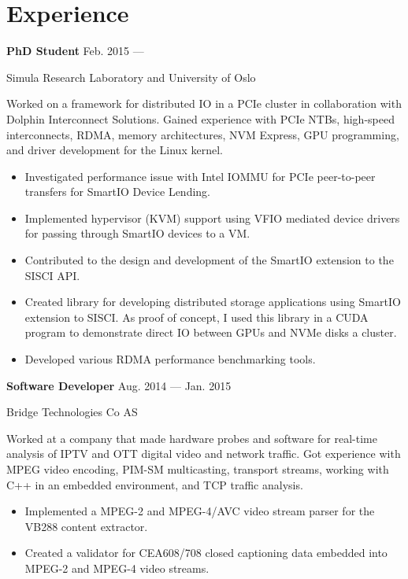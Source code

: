 \section{Experience}
\parbox[t][][t]{\linewidth}{
	\parbox{\linewidth}{\textbf{PhD Student}
		\hfill {{Feb. 2015 --- \phantom{Sep. 2018}}}}
		\smallbreak
	\parbox{\linewidth}{Simula Research Laboratory and University of Oslo}

	\bigskip
	Worked on a framework for distributed IO in a PCIe cluster in
	collaboration with Dolphin Interconnect Solutions. Gained
	experience with PCIe NTBs, high-speed interconnects, RDMA, memory
	architectures, NVM Express, GPU programming, and driver development for
	the Linux kernel.

	\bigskip
	\begin{itemize}
		\item{Investigated performance issue with Intel IOMMU for PCIe
			peer-to-peer transfers for SmartIO Device Lending.}\\[-.6em]
		\item{Implemented hypervisor (KVM) support using VFIO mediated device drivers
			for passing through SmartIO devices to a VM.}\\[-.6em]
		\item{Contributed to the design and development of the SmartIO
			extension to the SISCI API.}\\[-.6em]
		\item{Created library for developing distributed storage
			applications using SmartIO extension to SISCI.
			As proof of concept, I used this library in a CUDA program to demonstrate direct
			IO between GPUs and NVMe disks a cluster.}\\[-.6em]
		\item{Developed various RDMA performance benchmarking tools.}
	\end{itemize}
	\bigskip
	\bigskip
}

\parbox[t][][t]{\linewidth}{
	\parbox{\linewidth}{\textbf{Software Developer}
		\hfill {{Aug. 2014 --- Jan. 2015}}}
		\smallbreak
	\parbox{\linewidth}{Bridge Technologies Co AS}

	\bigskip
	Worked at a company that made hardware probes and software
	for real-time analysis of IPTV and OTT digital video and network
	traffic. Got experience with MPEG video encoding, PIM-SM multicasting, transport
	streams, working with C++ in an embedded environment, and TCP
	traffic analysis.

	\bigskip
	\begin{itemize}
		\item{Implemented a MPEG-2 and MPEG-4/AVC video stream parser for  the
			VB288 content extractor.}\\[-.6em]
		\item{Created a validator for CEA608/708 closed captioning data
		embedded into MPEG-2 and MPEG-4 video streams.}
	\end{itemize}
	\bigskip
	\bigskip
}

